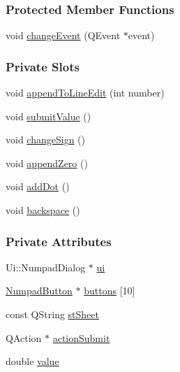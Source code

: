 \subsubsection*{Protected Member Functions}
\begin{DoxyCompactItemize}
\item 
void \mbox{\hyperlink{classNumpadDialog_a73f71a3f983e17628468bf843643542e}{change\+Event}} (Q\+Event $\ast$event)
\end{DoxyCompactItemize}
\subsubsection*{Private Slots}
\begin{DoxyCompactItemize}
\item 
void \mbox{\hyperlink{classNumpadDialog_a717c92c0ce30150bcb0d8bb963ba4b9a}{append\+To\+Line\+Edit}} (int number)
\item 
void \mbox{\hyperlink{classNumpadDialog_a09ad5d99606896df04a2e769595d7c7c}{submit\+Value}} ()
\item 
void \mbox{\hyperlink{classNumpadDialog_a588795ce96e78c629ac1825b9f3ab21d}{change\+Sign}} ()
\item 
void \mbox{\hyperlink{classNumpadDialog_a195579dcc41869beef3b584451614013}{append\+Zero}} ()
\item 
void \mbox{\hyperlink{classNumpadDialog_aeceb302071f824e0e725867eb8be11b5}{add\+Dot}} ()
\item 
void \mbox{\hyperlink{classNumpadDialog_ac0f1db7275e66501c52a5c1b9348ebd6}{backspace}} ()
\end{DoxyCompactItemize}
\subsubsection*{Private Attributes}
\begin{DoxyCompactItemize}
\item 
Ui\+::\+Numpad\+Dialog $\ast$ \mbox{\hyperlink{classNumpadDialog_a56da5fc9be6f1c34951959598cbdd187}{ui}}
\item 
\mbox{\hyperlink{classNumpadButton}{Numpad\+Button}} $\ast$ \mbox{\hyperlink{classNumpadDialog_a3b2f37aea17608ca6040eb8efa6c4cf9}{buttons}} \mbox{[}10\mbox{]}
\item 
const Q\+String \mbox{\hyperlink{classNumpadDialog_a28b20ba1a580943985c1791dde15bcb3}{st\+Sheet}}
\item 
Q\+Action $\ast$ \mbox{\hyperlink{classNumpadDialog_ae45e9a3690fa153aa637027397db1671}{action\+Submit}}
\item 
double \mbox{\hyperlink{classNumpadDialog_ad5046b269957f80f82d36b7ab800fc5d}{value}}
\end{DoxyCompactItemize}


